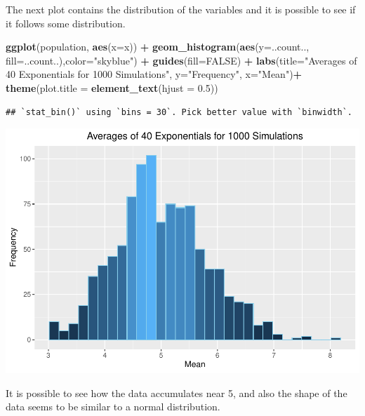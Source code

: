 \documentclass[
]{article}
\newenvironment{Shaded}{\begin{snugshade}}{\end{snugshade}}
\newcommand{\DataTypeTok}[1]{\textcolor[rgb]{0.13,0.29,0.53}{#1}}
\newcommand{\FloatTok}[1]{\textcolor[rgb]{0.00,0.00,0.81}{#1}}
\newcommand{\KeywordTok}[1]{\textcolor[rgb]{0.13,0.29,0.53}{\textbf{#1}}}
\newcommand{\NormalTok}[1]{#1}
\newcommand{\OperatorTok}[1]{\textcolor[rgb]{0.81,0.36,0.00}{\textbf{#1}}}
\newcommand{\OtherTok}[1]{\textcolor[rgb]{0.56,0.35,0.01}{#1}}
\newcommand{\StringTok}[1]{\textcolor[rgb]{0.31,0.60,0.02}{#1}}
\begin{document}
The next plot contains the distribution of the variables and it is
possible to see if it follows some distribution.

\begin{Shaded}
\begin{Highlighting}[]
\KeywordTok{ggplot}\NormalTok{(population, }\KeywordTok{aes}\NormalTok{(}\DataTypeTok{x=}\NormalTok{x)) }\OperatorTok{+}\StringTok{ }
\StringTok{  }\KeywordTok{geom_histogram}\NormalTok{(}\KeywordTok{aes}\NormalTok{(}\DataTypeTok{y=}\NormalTok{..count.., }\DataTypeTok{fill=}\NormalTok{..count..),}\DataTypeTok{color=}\StringTok{"skyblue"}\NormalTok{) }\OperatorTok{+}
\StringTok{  }\KeywordTok{guides}\NormalTok{(}\DataTypeTok{fill=}\OtherTok{FALSE}\NormalTok{) }\OperatorTok{+}
\StringTok{  }\KeywordTok{labs}\NormalTok{(}\DataTypeTok{title=}\StringTok{"Averages of 40 Exponentials for 1000 Simulations"}\NormalTok{, }\DataTypeTok{y=}\StringTok{"Frequency"}\NormalTok{, }\DataTypeTok{x=}\StringTok{"Mean"}\NormalTok{)}\OperatorTok{+}
\StringTok{  }\KeywordTok{theme}\NormalTok{(}\DataTypeTok{plot.title =} \KeywordTok{element_text}\NormalTok{(}\DataTypeTok{hjust =} \FloatTok{0.5}\NormalTok{))}
\end{Highlighting}
\end{Shaded}

\begin{verbatim}
## `stat_bin()` using `bins = 30`. Pick better value with `binwidth`.
\end{verbatim}

\includegraphics{Statistical-Inference-Course-Project_files/figure-latex/simulation2-1.pdf}

It is possible to see how the data accumulates near 5, and also the
shape of the data seems to be similar to a normal distribution.
\end{document}
